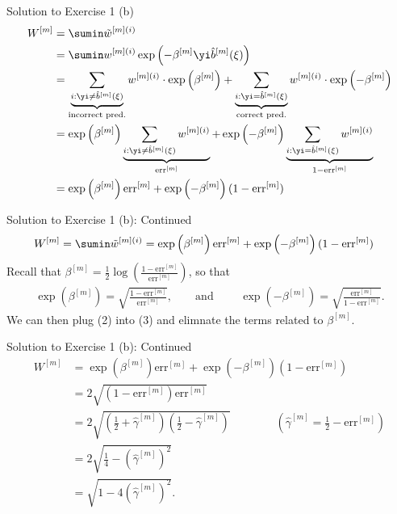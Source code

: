 \documentclass[aspectratio=169]{beamer}
\newcommand{\bhm}{\hat{b}^{[m]}}
\newcommand{\gammahm}{\hat{\gamma}^{[m]}}
\newcommand{\errm}{\mathrm{err}^{[m]}}
\newcommand{\Wm}{W^{[m]}}
\newcommand{\wmi}{w^{[m] (i)}}
\newcommand{\wtmi}{\tilde{w}^{[m](i)}}
\newcommand{\betam}{\beta^{[m]}}
\begin{document}
\begin{frame}{Solution to Exercise 1 (b)}
\small
	\begin{align*}
		\Wm &= \sumin \wtmi \\
		&= \sumin \wmi \exp \left( -\betam \yi \bhm (\xi) \right) \\
		&= \underbrace{\sum_{i: \yi \neq \bhm(\xi)}}_{\text{incorrect pred.}} \wmi \cdot \exp \left( \betam \right) + \underbrace{\sum_{i: \yi = \bhm (\xi)}}_{\text{correct pred.}} \wmi \cdot \exp \left( - \betam \right) \\
		&= \exp \left( \betam \right) \underbrace{\sum_{i: \yi \neq \bhm(\xi)} \wmi}_{\errm} + \exp \left( - \betam \right) \underbrace{\sum_{i: \yi = \bhm(\xi)} \wmi}_{1 - \errm} \\
		&= \exp \left( \betam \right) \errm + \exp \left(- \betam \right) (1 - \errm) \\
	\end{align*}
\end{frame}

\begin{frame}{Solution to Exercise 1 (b): Continued}
	\begin{align}
			\Wm &= \sumin \wtmi = \exp \left( \betam \right) \errm + \exp \left(- \betam \right) (1 - \errm)
	\end{align}
	Recall that $\betam = \frac{1}{2} \log \left(\frac{1 - \errm}{\errm} \right)$, so that 
	\begin{align}
		\exp \left( \betam \right) = \sqrt{\frac{1 - \errm}{\errm}}, \qquad \text{and } \qquad \exp \left( -\betam \right) = \sqrt{\frac{\errm}{1 - \errm}}.
	\end{align}
	We can then plug (2) into (3) and elimnate the terms related to $\betam$. 
\end{frame}

\begin{frame}{Solution to Exercise 1 (b): Continued}
	\begin{align*}
		\Wm &= \exp \left( \betam \right) \errm + \exp \left(- \betam \right) (1 - \errm) \\
		&= 2 \sqrt{( 1 - \errm) \errm} \\
		&= 2 \sqrt{\left(\frac{1}{2} + \gammahm \right) \left(\frac{1}{2} - \gammahm \right)} \qquad \qquad (\gammahm = \frac{1}{2} - \errm)\\
		&= 2 \sqrt{\frac{1}{4} - \left(\gammahm \right)^2} \\
		&= \sqrt{1 - 4 (\gammahm)^2}. \\
	\end{align*}
\end{frame}
\end{document}
